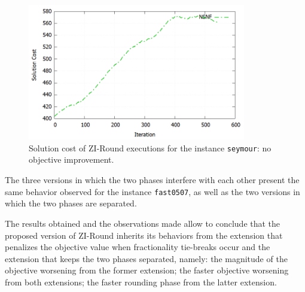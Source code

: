 \documentclass[a4paper,12pt]{book}
\begin{document}
\begin{figure}[ht]
	\centering
	\includegraphics[width=0.85\textwidth]{seymour-solcost-nsnf.png}
	\caption{Solution cost of ZI-Round executions for the instance \texttt{seymour}: no objective improvement.}
	\label{fig:seymour-solcost-nsnf}
\end{figure}
The three versions in which the two phases interfere with each other present the same behavior observed for the instance \texttt{fast0507}, as well as the two versions in which the two phases are separated. \par 

The results obtained and the observations made allow to conclude that the proposed version of ZI-Round inherits its behaviors from the extension that penalizes the objective value when fractionality tie-breaks occur and the extension that keeps the two phases separated, namely: the magnitude of the objective worsening from the former extension; the faster objective worsening from both extensions; the faster rounding phase from the latter extension.



\end{document}
